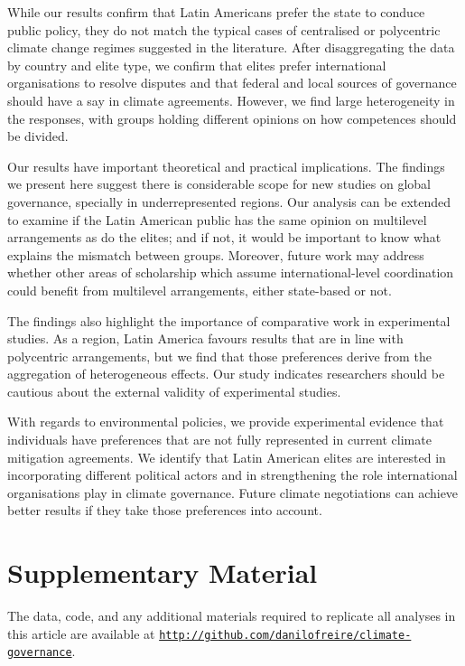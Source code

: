 \documentclass[a4paper,12pt]{article}
\begin{document}
While our results confirm that Latin Americans prefer the state to conduce public policy, they do not match the typical cases of centralised or polycentric climate change regimes suggested in the literature. After disaggregating the data by country and elite type, we confirm that elites prefer international organisations to resolve disputes and that federal and local sources of governance should have a say in climate agreements. However, we find large heterogeneity in the responses, with groups holding different opinions on how competences should be divided. 

Our results have important theoretical and practical implications. The findings we present here suggest there is considerable scope for new studies on global governance, specially in underrepresented regions. Our analysis can be extended to examine if the Latin American public has the same opinion on multilevel arrangements as do the elites; and if not, it would be important to know what explains the mismatch between groups. Moreover, future work may address whether other areas of scholarship which assume international-level coordination could benefit from multilevel arrangements, either state-based or not.   

The findings also highlight the importance of comparative work in experimental studies. As a region, Latin America favours results that are in line with polycentric arrangements, but we find that those preferences derive from the aggregation of heterogeneous effects. Our study indicates researchers should be cautious about the external validity of experimental studies. 

With regards to environmental policies, we provide experimental evidence that individuals have preferences that are not fully represented in current climate mitigation agreements. We identify that Latin American elites are interested in incorporating different political actors and in strengthening the role international organisations play in climate governance. Future climate negotiations can achieve better results if they take those preferences into account.

\section*{Supplementary Material}
\label{sec:supplementary}

The data, code, and any additional materials required to replicate all analyses in this article are available at \href{http://github.com/danilofreire/climate-governance}{\texttt{http://github.com/danilofreire/climate-governance}}.



\end{document}
